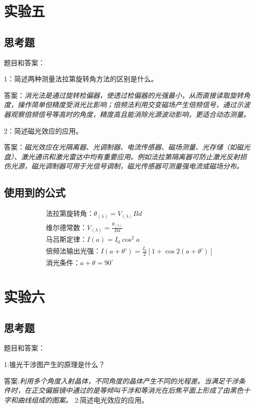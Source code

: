 \documentclass[10pt,journal,compsoc]{IEEEtran}
\begin{document}
\section{实验五}
\subsection{思考题}
题目和答案：

1：简述两种测量法拉第旋转角方法的区别是什么。

答案：\textit{消光法是通过旋转检偏器，使透过检偏器的光强最小，从而直接读取旋转角度，操作简单但精度受消光比影响；倍频法利用交变磁场产生倍频信号，通过示波器观察倍频信号等高时的角度，精度高且能消除光源波动影响，更适合动态测量。}

2：简述磁光效应的应用。

答案：\textit{磁光效应在光隔离器、光调制器、电流传感器、磁场测量、光存储（如磁光盘）、激光通讯和激光雷达中均有重要应用。例如法拉第隔离器可防止激光反射损伤光源，磁光调制器可用于光信号调制，磁光传感器可测量强电流或磁场分布。}

\subsection{使用到的公式}
\begin{align*}
&\text{法拉第旋转角：}\theta_{(\lambda)} = V_{(\lambda)} B d \\
&\text{维尔德常数：}V_{(\lambda)} = \frac{\theta_{(\lambda)}}{B d} \\
&\text{马吕斯定律：}I(a) = I_0 \cos^2 a \\
&\text{倍频法输出光强：}I(a+\theta') = \frac{I_0}{2} \left[1 + \cos 2(a+\theta')\right] \\
&\text{消光条件：}a + \theta = 90^\circ
\end{align*}

\section{实验六}
\subsection{思考题}
题目和答案：

1:锥光干涉图产生的原理是什么？

答案:\textit{利用多个角度入射晶体，不同角度的晶体产生不同的光程差。当满足干涉条件时，在正交偏振镜中通过的是等倾叫干涉和等消光在后焦平面上形成了由黑色十字和曲线组成的图案。}
2:简述电光效应的应用。
\end{document}
